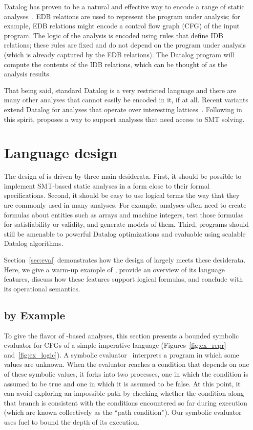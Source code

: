 \documentclass[acmsmall,screen,nonacm]{acmart}
\theoremstyle{definition}
\begin{document}
Datalog has proven to be a natural and effective way to encode a range of
static
analyses~\citep{bddbddbPointer,doop,gigahorse,datalogdisassembly,bddbddbSecurity,souffle1,gatekeeper,madmax,securify}.
EDB relations are used to represent the program under analysis; for example,
EDB relations might encode a control flow graph (CFG) of the input program.
The logic of the analysis is encoded using rules that define IDB relations;
these rules are fixed and do not depend on the program under analysis (which is
already captured by the EDB relations).
The Datalog program will compute the contents of the IDB relations, which can
be thought of as the analysis results.

That being said, standard Datalog is a very restricted language and there are
many other analyses that cannot easily be encoded in it, if at all.
Recent variants extend Datalog for analyses that operate over interesting
lattices~\citep{flix,inca}.
Following in this spirit, \Name proposes a way to support analyses that need
access to SMT solving.

\section{Language design}\label{sec:language}

The design of \Name is driven by three main desiderata.
First, it should be possible to implement SMT-based static analyses in a form
close to their formal specifications.
Second, it should be easy to use logical terms the way that they are commonly
used in many analyses.
For example, analyses often need to create formulas about entities such as
arrays and machine integers, test those formulas for satisfiability or
validity, and generate models of them.
Third, \Name programs should still be amenable to powerful Datalog
optimizations and evaluable using scalable Datalog algorithms.

Section~\ref{sec:eval} demonstrates how the design of \Name largely meets these
desiderata.
Here, we give a warm-up example of \Name, provide an overview of its language
features, discuss how these features support logical formulas, and conclude
with its operational semantics.

\subsection{\Name by Example}

To give the flavor of \Name-based analyses, this section presents a bounded
symbolic evaluator for CFGs of a simple imperative language
(Figures~\ref{fig:ex_repr} and~\ref{fig:ex_logic}).
A symbolic evaluator~\citep{king} interprets a program in which some values are
unknown.
When the evaluator reaches a condition that depends on one of these symbolic
values, it forks into two processes, one in which the condition is assumed to
be true and one in which it is assumed to be false.
At this point, it can avoid exploring an impossible path by checking whether
the condition along that branch is consistent with the conditions encountered
so far during execution (which are known collectively as the ``path
condition'').
Our symbolic evaluator uses fuel to bound the depth of its execution.
\end{document}
